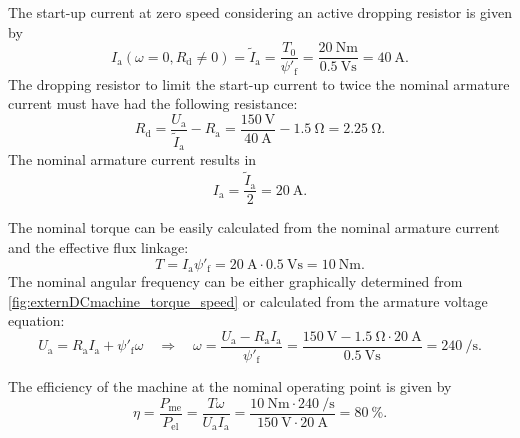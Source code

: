 \begin{solutionblock}
  The start-up current at zero speed considering an active dropping resistor is given by
  \begin{equation}
    I_\mathrm{a}(\omega=0, R_\mathrm{d}\neq 0) =\tilde{I}_\mathrm{a}= \frac{T_0}{\psi'_\mathrm{f}} = \frac{\SI{20}{\newton\meter}}{\SI{0.5}{\volt\second}} = \SI{40}{\ampere}.
  \end{equation}
  The dropping resistor to limit the start-up current to twice the nominal armature current must have had the following resistance:
  \begin{equation}
    R_\mathrm{d} = \frac{U_\mathrm{a}}{\tilde{I}_\mathrm{a}} - R_\mathrm{a} = \frac{\SI{150}{\volt}}{\SI{40}{\ampere}} - \SI{1.5}{\ohm} = \SI{2.25}{\ohm}.
  \end{equation}
  The nominal armature current results in
  \begin{equation}
    I_\mathrm{a} = \frac{\tilde{I}_\mathrm{a}}{2} = \SI{20}{\ampere}.
  \end{equation}
\end{solutionblock}

\begin{solutionblock}
  The nominal torque can be easily calculated from the nominal armature current and the effective flux linkage:
  \begin{equation}
    T = I_\mathrm{a} \psi'_\mathrm{f} = \SI{20}{\ampere} \cdot \SI{0.5}{\volt\second} = \SI{10}{\newton\meter}.
  \end{equation}
  The nominal angular frequency can be either graphically determined from \autoref{fig:externDCmachine_torque_speed} or calculated from the armature voltage equation:
  \begin{equation}
    U_\mathrm{a} = R_\mathrm{a} I_\mathrm{a} + \psi'_\mathrm{f} \omega \quad \Rightarrow \quad \omega = \frac{U_\mathrm{a}-R_\mathrm{a} I_\mathrm{a}}{\psi'_\mathrm{f}} = \frac{\SI{150}{\volt}-\SI{1.5}{\ohm}\cdot\SI{20}{\ampere}}{\SI{0.5}{\volt\second}} = \SI{240}{\per\second}.
  \end{equation}
\end{solutionblock}


\begin{solutionblock}
  The efficiency of the machine at the nominal operating point is given by
  \begin{equation}
    \eta = \frac{P_\mathrm{me}}{P_\mathrm{el}} = \frac{T \omega}{U_\mathrm{a} I_\mathrm{a}} = \frac{\SI{10}{\newton\meter} \cdot \SI{240}{\per\second}}{\SI{150}{\volt} \cdot \SI{20}{\ampere}} = \SI{80}{\percent}.
  \end{equation}
\end{solutionblock}